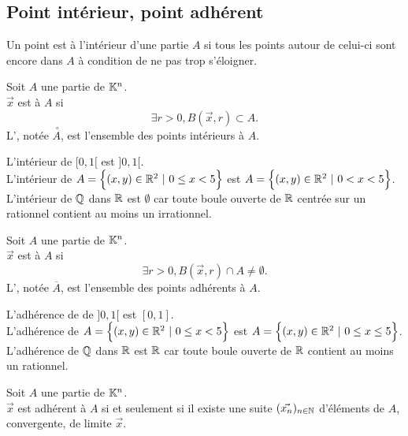 \documentclass{book}
\begin{document}
\subsection{Point intérieur, point adhérent}
Un point est à l'intérieur d'une partie $A$ si tous les points autour de celui-ci sont encore dans $A$ à condition de ne pas trop s'éloigner.
\begin{Definition}[Intérieur]
Soit $A$ une partie de $\mathbb{K}^n$.\\
$\vec{x}$ est  à $A$ si $$\exists  r > 0, B (\vec{x}, r) \subset A.$$
L', notée $\stackrel {\ \circ }{A}$, est l'ensemble des points intérieurs à $A$.\\
\end{Definition}
\begin{Exemple}
L'intérieur de $[0,1[$ est $]0,1[$.\\
L'intérieur de  $A  =\Big\{(x,y)\in\R^2\ |\ 0\leq x<5 \Big\}$ est  
$A  =\Big\{(x,y)\in\mathbb{R}^2\ |\ 0< x<5 \Big\}$.\\
L'intérieur de $\mathbb{Q}$ dans $\mathbb{R}$ est $\emptyset$ car  toute boule ouverte de $\mathbb{R}$ centrée sur un rationnel contient au moins un irrationnel.
\end{Exemple}
\begin{Definition}[Adhérent]
Soit $A$ une partie de $\mathbb{K}^n$.\\
$\vec{x}$ est  à $A$ si $$\exists  r > 0, B (\vec{x}, r) \cap A\neq \emptyset .$$
L', notée $\overline {A}$, est l'ensemble des points adhérents à $A$.\\
\end{Definition}
\begin{Exemple}
L'adhérence de de $]0,1[$ est $[0,1]$.\\
L'adhérence de  $A  =\Big\{(x,y)\in\R^2\ |\ 0\leq x<5 \Big\}$ est  
$A  =\Big\{(x,y)\in\mathbb{R}^2\ |\ 0\leq x\leq5 \Big\}$.\\
L'adhérence de $\mathbb{Q}$ dans $\mathbb{R}$ est $\mathbb{R}$ car  toute boule ouverte de $\mathbb{R}$ contient au moins un rationnel.
\end{Exemple}
\begin{Proposition}
Soit $A$ une partie de $\mathbb{K}^n$.\\
$\vec{x}$ est adhérent à $A$ si et seulement si il existe une suite $(\vec{x_n})_{n\in\mathbb{N}}$
d'éléments de $A$, convergente, de limite $\vec{x}$.
\end{Proposition}
\end{document}
